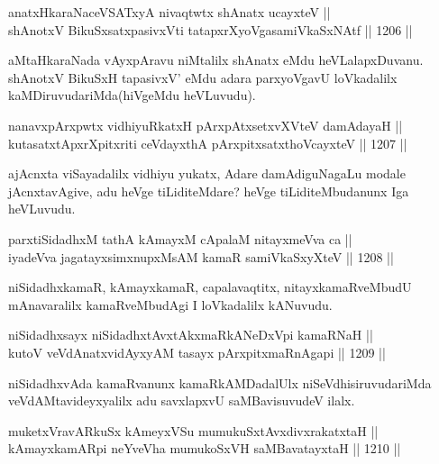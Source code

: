 
\begin{shl}
anatxHkaraNaceVSATxyA nivaqtwtx shAnatx ucayxteV || \\
shAnotxV BikuSxsatxpasivxVti tatapxrXyoVgasamiVkaSxNAtf \hfill || 1206 ||  
\end{shl}

\begin{artha}
aMtaHkaraNada vAyxpAravu niMtalilx shAnatx eMdu heVLalapxDuvanu. shAnotxV BikuSxH tapasivxV' eMdu adara parxyoVgavU loVkadalilx kaMDiruvudariMda(hiVgeMdu heVLuvudu).
\end{artha}


\begin{shl}
nanavxpArxpwtx vidhiyuRkatxH pArxpAtxsetxvXVteV damAdayaH || \\
kutasatxtApxrXpitxriti ceVdayxthA pArxpitxsatxthoVcayxteV \hfill || 1207 ||  
\end{shl}

\begin{artha}
ajAcnxta viSayadalilx vidhiyu yukatx, Adare damAdiguNagaLu modale jAcnxtavAgive, adu heVge tiLiditeMdare? heVge tiLiditeMbudanunx Iga heVLuvudu.
\end{artha}

\begin{shl}
parxtiSidadhxM tathA kAmayxM cApalaM nitayxmeVva ca || \\
iyadeVva jagatayxsimxnupxMsAM kamaR samiVkaSxyXteV \hfill || 1208 ||  
\end{shl}

\begin{artha}
niSidadhxkamaR, kAmayxkamaR, capalavaqtitx, nitayxkamaRveMbudU mAnavaralilx kamaRveMbudAgi I loVkadalilx kANuvudu.
\end{artha}

\begin{shl}
niSidadhxsayx niSidadhxtAvxtAkxmaRkANeDxV\s pi kamaRNaH || \\
kutoV veVdAnatxvidAyxyAM tasayx pArxpitxmaRnAgapi \hfill || 1209 ||  
\end{shl}

\begin{artha}
niSidadhxvAda kamaRvanunx kamaRkAMDadalUlx niSeVdhisiruvudariMda veVdAMtavideyxyalilx adu savxlapxvU saMBavisuvudeV ilalx.
\end{artha}

\begin{shl}
muketxVravARkuSx kAmeyxVSu mumukuSxtAvxdivxrakatxtaH || \\
kAmayxkamARpi neYveVha mumukoSxVH saMBavatayxtaH \hfill || 1210 ||  
\end{shl}

